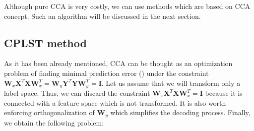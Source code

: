 Although pure CCA is very costly, we can use methods which are based on CCA concept. Such an algorithm will be discussed in the next section.

\subsection{CPLST method}\label{sec:cplst}

As it has been already mentioned, CCA can be thought as an optimization problem of finding minimal prediction error () under the constraint $\boldsymbol{W}_x\boldsymbol{X}^T\boldsymbol{X}\boldsymbol{W}_x^T=\boldsymbol{W}_y\boldsymbol{Y}^T\boldsymbol{Y}\boldsymbol{W}_y^T=\boldsymbol{I}$. Let us assume that we will transform only a label space. Thus, we can discard the constraint $\boldsymbol{W}_x\boldsymbol{X}^T\boldsymbol{X}\boldsymbol{W}_x^T=\boldsymbol{I}$ because it is connected with a feature space which is not transformed. It is also worth enforcing orthogonalization of $\boldsymbol{W}_y$  which simplifies the decoding process. Finally, we obtain the following problem:

